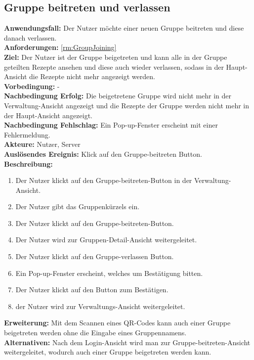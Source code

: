 \documentclass[parskip=full]{scrartcl}
\begin{document}
\subsection{Gruppe beitreten und verlassen}
\textbf{Anwendungsfall:} Der Nutzer möchte einer neuen Gruppe beitreten und diese danach verlassen.\\
\textbf{Anforderungen:} \ref{rm:GroupJoining} \\
\textbf{Ziel:} Der Nutzer ist der Gruppe beigetreten und kann alle in der Gruppe geteilten Rezepte ansehen und diese auch wieder verlassen, sodass in der Haupt-Ansicht die Rezepte nicht mehr angezeigt werden.\\
\textbf{Vorbedingung:} -\\
\textbf{Nachbedingung Erfolg:} Die beigetretene Gruppe wird nicht mehr in der Verwaltung-Ansicht angezeigt und die Rezepte der Gruppe werden nicht mehr in der Haupt-Ansicht angezeigt.\\
\textbf{Nachbedingung Fehlschlag:} Ein Pop-up-Fenster erscheint mit einer Fehlermeldung.\\
\textbf{Akteure:} Nutzer, Server\\
\textbf{Auslösendes Ereignis:} Klick auf den Gruppe-beitreten Button.\\
\textbf{Beschreibung:}\\
\begin{enumerate}
    \item Der Nutzer klickt auf den Gruppe-beitreten-Button in der Verwaltung-Ansicht.
    \item Der Nutzer gibt das Gruppenkürzels ein.
    \item Der Nutzer klickt auf den Gruppe-beitreten-Button.
    \item Der Nutzer wird zur Gruppen-Detail-Ansicht weitergeleitet.
    \item Der Nutzer klickt auf den Gruppe-verlassen Button.
    \item Ein Pop-up-Fenster erscheint, welches um Bestätigung bitten.
    \item Der Nutzer klickt auf den Button zum Bestätigen.
    \item der Nutzer wird zur Verwaltungs-Ansicht weitergeleitet.
\end{enumerate}
\textbf{Erweiterung:} Mit dem Scannen eines QR-Codes kann auch einer Gruppe beigetreten werden ohne die Eingabe eines Gruppennamens.\\
\textbf{Alternativen:} Nach dem Login-Ansicht wird man zur Gruppe-beitreten-Ansicht weitergeleitet, wodurch auch einer Gruppe beigetreten werden kann.
\newpage
\end{document}
